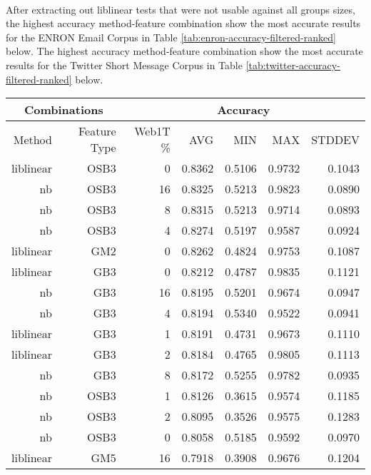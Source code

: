 	\paragraph*{} After extracting out liblinear tests that were not usable against all groups sizes, the highest accuracy method-feature combination show the most accurate results for the ENRON Email Corpus in Table \ref{tab:enron-accuracy-filtered-ranked} below.  The highest accuracy method-feature combination show the most accurate results for the Twitter Short Message Corpus in Table \ref{tab:twitter-accuracy-filtered-ranked} below.
	
	
	\begin{table}[htbp!]
			\begin{center}
			\begin{tabular}{ | r | r | r | r | r | r | r | }
			\hline
			\multicolumn{2}{|c|}{Combinations} & \multicolumn{5}{|c|}{Accuracy}\\
			\hline
			Method & Feature Type & Web1T \% & AVG & MIN & MAX & STDDEV\\ \hline 
			liblinear & OSB3 & 0 & 0.8362 & 0.5106 & 0.9732 & 0.1043\\ \hline 
			nb & OSB3 & 16 & 0.8325 & 0.5213 & 0.9823 & 0.0890\\ \hline 
			nb & OSB3 & 8 & 0.8315 & 0.5213 & 0.9714 & 0.0893\\ \hline 
			nb & OSB3 & 4 & 0.8274 & 0.5197 & 0.9587 & 0.0924\\ \hline 
			liblinear & GM2 & 0 & 0.8262 & 0.4824 & 0.9753 & 0.1087\\ \hline 
			liblinear & GB3 & 0 & 0.8212 & 0.4787 & 0.9835 & 0.1121\\ \hline 
			nb & GB3 & 16 & 0.8195 & 0.5201 & 0.9674 & 0.0947\\ \hline 
			nb & GB3 & 4 & 0.8194 & 0.5340 & 0.9522 & 0.0941\\ \hline 
			liblinear & GB3 & 1 & 0.8191 & 0.4731 & 0.9673 & 0.1110\\ \hline 
			liblinear & GB3 & 2 & 0.8184 & 0.4765 & 0.9805 & 0.1113\\ \hline 
			nb & GB3 & 8 & 0.8172 & 0.5255 & 0.9782 & 0.0935\\ \hline 
			nb & OSB3 & 1 & 0.8126 & 0.3615 & 0.9574 & 0.1185\\ \hline 
			nb & OSB3 & 2 & 0.8095 & 0.3526 & 0.9575 & 0.1283\\ \hline 
			nb & OSB3 & 0 & 0.8058 & 0.5185 & 0.9592 & 0.0970\\ \hline 
			liblinear & GM5 & 16 & 0.7918 & 0.3908 & 0.9676 & 0.1204\\ \hline 

\end{tabular}
\end{center}
\end{table}
